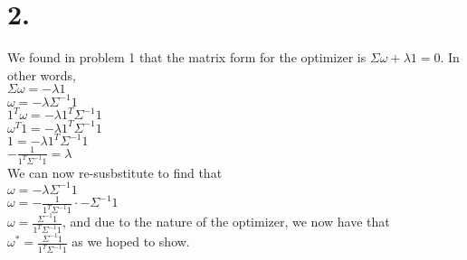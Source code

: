 \documentclass{article}
\begin{document}
\section*{2.}
{\Large

We found in problem 1 that the matrix form for the optimizer is $\Sigma \omega + \lambda 1 = 0$. In other words, \\
$\Sigma \omega = -\lambda1$ \\
$\omega = -\lambda\Sigma^{-1}1$ \\
$1^T\omega = -\lambda1^T\Sigma^{-1}1$ \\
$\omega^T1 = -\lambda1^T\Sigma^{-1}1$ \\
$1 = -\lambda1^T\Sigma^{-1}1$ \\
$-\frac{1}{1^T\Sigma^{-1}1} = \lambda$ \\ 
We can now re-susbstitute to find that \\ 
$\omega = -\lambda\Sigma^{-1}1$ \\
$\omega = -\frac{1}{1^T\Sigma^{-1}1} \cdot -\Sigma^{-1}1$ \\ 
$\omega = \frac{\Sigma^{-1}1}{1^T\Sigma^{-1}1}$, and due to the nature of the optimizer, we now have that \\
$\omega^* = \frac{\Sigma^{-1}1}{1^T\Sigma^{-1}1}$ 
as we hoped to show.

}
\end{document}
